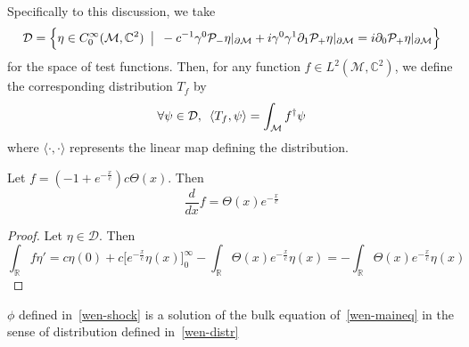 \begin{definition}\label{wen-distr}
Specifically to this discussion, 
we take
\begin{equation*}
\mathcal{D} = \Big\{\eta \in C^{\infty}_0(\mathcal{M}, \mathbb{C}^2) \enskip\big\vert \enskip -c^{-1}\gamma^0\mathcal{P}_-\eta\vert_{\partial\mathcal{M}} + i\gamma^0\gamma^1\partial_1\mathcal{P}_+\eta\vert_{\partial \mathcal{M}}= i\partial_0\mathcal{P}_+\eta\vert_{\partial\mathcal{M}} \Big\}
\end{equation*}
for the space of test functions. 
Then, for any function $f \in L^{2}(\mathcal{M}, \mathbb{C}^2)$, we define the corresponding distribution $T_f$ by
\begin{equation*}
\forall \psi\in \mathcal{D}, \enskip \langle T_f, \psi\rangle = \int_{\mathcal{M}} f^\dagger \psi
\end{equation*}
where $\langle \cdot , \cdot \rangle$ represents the linear map defining the distribution.
\end{definition}
%
\begin{lemma}\label{wen-lem}
Let $f = (-1+ e^{-\frac{x}{c}})c\Theta(x)$. Then \begin{equation*}\frac{d}{d x} f = \Theta(x)e^{-\frac {x}{c}}\end{equation*}
\end{lemma}
\begin{proof}
Let $\eta\in \mathcal{D}$. Then
\begin{equation*}
\int_\mathbb{R} f \eta'  =   c\eta(0) + c\Big[ e^{-\frac{x}{c}} \eta(x) \Big]^\infty_0 - \int_\mathbb{R}\Theta(x)e^{-\frac{x}{c}}\eta(x) = -\int_\mathbb{R}\Theta(x)e^{-\frac{x}{c}}\eta(x)
\end{equation*}
\end{proof}
\begin{proposition}
$\phi$ defined in~\cref{wen-shock} is a solution of the bulk equation of~\cref{wen-maineq} in the sense of distribution defined in~\cref{wen-distr}
\end{proposition}
